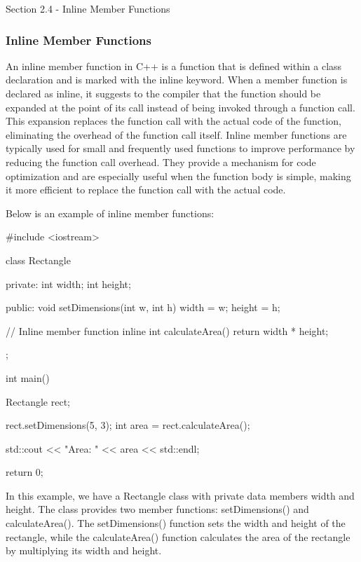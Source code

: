 \begin{notes}{Section 2.4 - Inline Member Functions}
    \subsubsection*{Inline Member Functions}

    An inline member function in C++ is a function that is defined within a class declaration and is marked with the inline keyword. When a member function is declared as inline, it suggests to the compiler that 
    the function should be expanded at the point of its call instead of being invoked through a function call. This expansion replaces the function call with the actual code of the function, eliminating the overhead 
    of the function call itself. Inline member functions are typically used for small and frequently used functions to improve performance by reducing the function call overhead. They provide a mechanism for code 
    optimization and are especially useful when the function body is simple, making it more efficient to replace the function call with the actual code.
    
    \begin{highlight}
        Below is an example of inline member functions:
    \begin{code}[C++]
    #include <iostream>

    class Rectangle {
    private:
        int width;
        int height;
        
    public:
        void setDimensions(int w, int h) {
            width = w;
            height = h;
        }
        
        // Inline member function
        inline int calculateArea() {
            return width * height;
        }
    };
    
    int main() {
        Rectangle rect;
        
        rect.setDimensions(5, 3);
        int area = rect.calculateArea();
        
        std::cout << "Area: " << area << std::endl;
        
        return 0;
    }        
    \end{code}
        In this example, we have a Rectangle class with private data members width and height. The class provides two member functions: setDimensions() and calculateArea(). The setDimensions() function sets the width 
        and height of the rectangle, while the calculateArea() function calculates the area of the rectangle by multiplying its width and height.
    

\end{highlight}
\end{notes}

